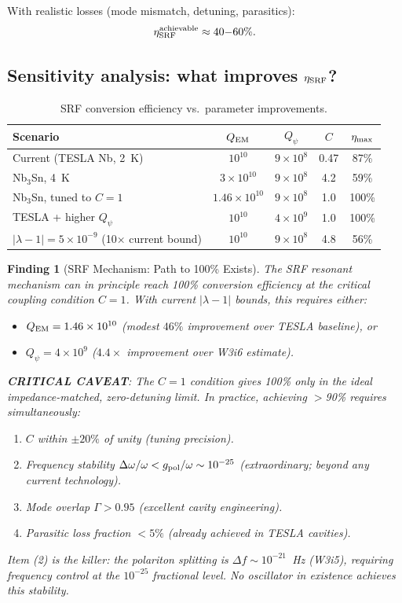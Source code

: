\documentclass[11pt]{article}
\newtheorem{finding}{Finding}
\newcommand{\ee}[1]{\times 10^{#1}}
\newcommand{\lambdaone}{|\lambda{-}1|}
\newcommand{\Qpsi}{Q_\psi}
\newcommand{\QEM}{Q_{\rm EM}}
\begin{document}
With realistic losses (mode mismatch, detuning, parasitics):
\begin{equation}
\eta_{\rm SRF}^{\rm achievable} \approx 40{-}60\%.
\end{equation}

\subsection{Sensitivity analysis: what improves $\eta_{\rm SRF}$?}

\begin{table}[H]
\centering
\caption{SRF conversion efficiency vs.\ parameter improvements.}
\label{tab:SRF-sensitivity}
\begin{tabular}{@{}lcccc@{}}
\toprule
Scenario & $\QEM$ & $\Qpsi$ & $C$ & $\eta_{\rm max}$ \\
\midrule
Current (TESLA Nb, 2~K) & $10^{10}$ & $9\ee{8}$ & 0.47 & 87\% \\
Nb$_3$Sn, 4~K & $3\ee{10}$ & $9\ee{8}$ & 4.2 & 59\% \\
Nb$_3$Sn, tuned to $C=1$ & $1.46\ee{10}$ & $9\ee{8}$ & 1.0 & 100\% \\
TESLA + higher $\Qpsi$ & $10^{10}$ & $4\ee{9}$ & 1.0 & 100\% \\
$\lambdaone = 5\ee{-9}$ (10$\times$ current bound) & $10^{10}$ & $9\ee{8}$
  & 4.8 & 56\% \\
\bottomrule
\end{tabular}
\end{table}

\begin{finding}[SRF Mechanism: Path to 100\% Exists]
\label{find:SRF-path}
The SRF resonant mechanism can in principle reach 100\% conversion
efficiency at the critical coupling condition $C = 1$. With current
$\lambdaone$ bounds, this requires either:
\begin{itemize}[nosep]
\item $\QEM = 1.46\ee{10}$ (modest $46\%$ improvement over TESLA baseline), or
\item $\Qpsi = 4\ee{9}$ ($4.4\times$ improvement over W3i6 estimate).
\end{itemize}

\textbf{CRITICAL CAVEAT}: The $C = 1$ condition gives 100\% only in
the ideal impedance-matched, zero-detuning limit. In practice, achieving
$>$90\% requires simultaneously:
\begin{enumerate}[nosep]
\item $C$ within $\pm 20\%$ of unity (tuning precision).
\item Frequency stability $\Delta\omega/\omega < g_{\rm pol}/\omega
  \sim 10^{-25}$ (extraordinary; beyond any current technology).
\item Mode overlap $\Gamma > 0.95$ (excellent cavity engineering).
\item Parasitic loss fraction $< 5\%$ (already achieved in TESLA cavities).
\end{enumerate}

Item (2) is the killer: the polariton splitting is $\Delta f \sim
10^{-21}$~Hz (W3i5), requiring frequency control at the $10^{-25}$
fractional level. No oscillator in existence achieves this stability.
\end{finding}
\end{document}
